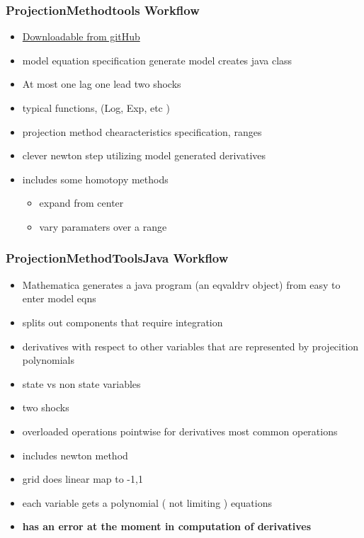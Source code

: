 \documentclass[tikz]{beamer}
\begin{document}
\begin{frame}
  \frametitle{ProjectionMethodtools Workflow}
  \begin{itemize}
    \item  \href{https://github.com/es335mathwiz/ProjectionMethodTools.git}{Downloadable from gitHub}
  \item model equation specification generate model creates java class
  \item At most one lag 
one lead two shocks 
\item typical functions, (Log,  Exp, etc )
  \item projection method chearacteristics specification, ranges
    \item clever newton step utilizing  model generated derivatives
    \item includes some homotopy methods
      \begin{itemize}
   \item expand from center
\item vary paramaters over a range
      \end{itemize}
  \end{itemize}
\end{frame}


\begin{frame}
  \frametitle{ProjectionMethodToolsJava Workflow}
    \begin{itemize}
  \item Mathematica generates a java program (an eqvaldrv object) from easy to enter model eqns
    \item splits out components that require integration
    \item derivatives with respect to other variables that are represented by projecition polynomials
    \item state vs non state variables
    \item two shocks
    \item overloaded operations pointwise for derivatives most common operations
    \item includes newton method
  \item grid does linear map to -1,1
  \item each variable gets a polynomial  ( not limiting )
equations
    \item {\bf has an error at the moment in computation of derivatives}
    \end{itemize}


\end{frame}
\end{document}
